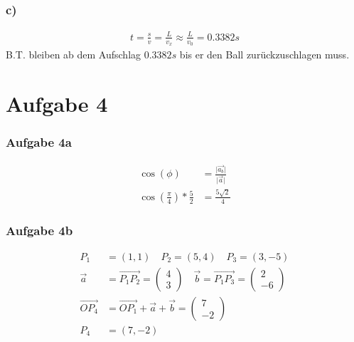 \documentclass[a4paper,11pt]{article}
\begin{document}
      \subsubsection*{c)}
        \begin{align*}
          t=\frac{s}{v}=\frac{L}{v_x}\approx\frac{L}{v_0}=0.3382s
        \end{align*}
        B.T. bleiben ab dem Aufschlag $0.3382s$ bis er den Ball zurückzuschlagen muss.
\section*{Aufgabe 4}
  \subsubsection*{Aufgabe 4a}
    \begin{align*}
      \cos(\phi)&=\frac{\vert\vec{a_b}\vert}{\vert\vec{a}\vert} \\
      \cos\left(\frac{\pi}{4}\right)*\frac{5}{2}&=\frac{5\sqrt{2}}{4}
    \end{align*}
    
  \subsubsection*{Aufgabe 4b}
    \begin{align*}
      P_1&=(1,1) \quad P_2=(5,4) \quad P_3=(3,-5) \\
      \vec{a}&=\overrightarrow{P_1P_2}=\begin{pmatrix}4\\3\end{pmatrix} \quad \vec{b}=\overrightarrow{P_1P_3}=\begin{pmatrix}2\\-6\end{pmatrix} \\
      \overrightarrow{OP_4}&=\overrightarrow{OP_1}+\vec{a}+\vec{b}=\begin{pmatrix}7\\-2\end{pmatrix} \\
      P_4&=(7,-2)
    \end{align*}
    
\end{document}
